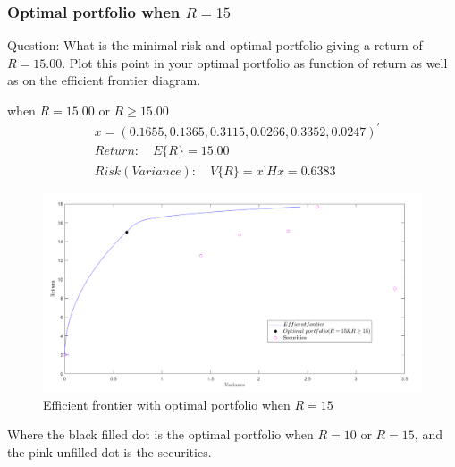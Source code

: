 \subsubsection{\bfseries Optimal portfolio when $R=15$}
\begin{shaded}
{ Question: What is the minimal risk and optimal portfolio giving a return of $R = 15.00$. Plot
this point in your optimal portfolio as function of return as well as on the efficient
frontier diagram.}
\end{shaded}
when $R=15.00$ or $R\ge 15.00$
\begin{align*}
&    x=(0.1655,0.1365,0.3115,0.0266,0.3352,0.0247)^{\prime}\\
&Return: \quad E\{ R\}=15.00\\
&Risk(Variance):\quad V\{ R\}=x^{\prime}Hx=0.6383
\end{align*}
\begin{figure}[H]
\centering
\includegraphics[scale=0.5]{figures/eff_fro3.PNG}
\caption{Efficient frontier with optimal
portfolio when $R=15$ }
\label{fig:labe3.2.2}
\end{figure}
Where the black filled dot is the optimal  portfolio when $R=10$ or $R=15$, and the pink unfilled dot is the securities.
